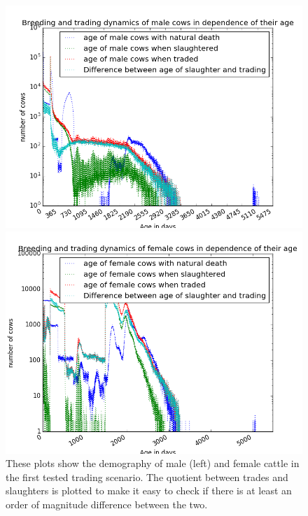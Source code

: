 \begin{figure}[htbp]
\begin{minipage}{0.5\textwidth}
\centering
\noindent\includegraphics[width=0.9\linewidth,height=\textheight,
keepaspectratio]{scen1maleDemography.png} 
\end{minipage}
\begin{minipage}{0.5\textwidth}
\centering
\noindent\includegraphics[width=0.9\linewidth,height=\textheight,
keepaspectratio]{scen1femaleDemography.png} 
\end{minipage}
\caption[Demography in Scenario 1]{These plots show the demography of male (left) and female cattle in the first tested trading scenario. The quotient between trades and slaughters is plotted to make it easy to check if there is at least an order of magnitude difference between the two.}
\label{fig:demographyScen1}
\end{figure} 


